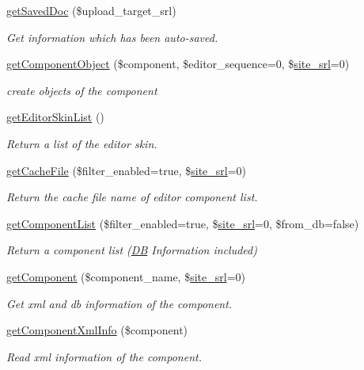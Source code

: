 \begin{DoxyCompactItemize}
\hyperlink{classeditorModel_af9c4c2f7ba2d377b087cac08412b0baa}{get\+Saved\+Doc} (\$upload\+\_\+target\+\_\+srl)
\begin{DoxyCompactList}\small\item\em Get information which has been auto-\/saved. \end{DoxyCompactList}\item 
\hyperlink{classeditorModel_aef219fecfb7dcd9343cc9028930eaccd}{get\+Component\+Object} (\$component, \$editor\+\_\+sequence=0, \$\hyperlink{ko_8install_8php_a8b1406b4ad1048041558dce6bfe89004}{site\+\_\+srl}=0)
\begin{DoxyCompactList}\small\item\em create objects of the component \end{DoxyCompactList}\item 
\hyperlink{classeditorModel_ae67ee69d58776938a04d14d0df5284ff}{get\+Editor\+Skin\+List} ()
\begin{DoxyCompactList}\small\item\em Return a list of the editor skin. \end{DoxyCompactList}\item 
\hyperlink{classeditorModel_ab125348dd5be10fdafe6e38922254d5e}{get\+Cache\+File} (\$filter\+\_\+enabled=true, \$\hyperlink{ko_8install_8php_a8b1406b4ad1048041558dce6bfe89004}{site\+\_\+srl}=0)
\begin{DoxyCompactList}\small\item\em Return the cache file name of editor component list. \end{DoxyCompactList}\item 
\hyperlink{classeditorModel_a24cf5d2f9bc9783dd2efd85fb0f89408}{get\+Component\+List} (\$filter\+\_\+enabled=true, \$\hyperlink{ko_8install_8php_a8b1406b4ad1048041558dce6bfe89004}{site\+\_\+srl}=0, \$from\+\_\+db=false)
\begin{DoxyCompactList}\small\item\em Return a component list (\hyperlink{classDB}{DB} Information included) \end{DoxyCompactList}\item 
\hyperlink{classeditorModel_a6330fcddc7363899989bfe4128010236}{get\+Component} (\$component\+\_\+name, \$\hyperlink{ko_8install_8php_a8b1406b4ad1048041558dce6bfe89004}{site\+\_\+srl}=0)
\begin{DoxyCompactList}\small\item\em Get xml and db information of the component. \end{DoxyCompactList}\item 
\hyperlink{classeditorModel_ade91abf13956321e293195f2f14b4e2b}{get\+Component\+Xml\+Info} (\$component)
\begin{DoxyCompactList}\small\item\em Read xml information of the component. \end{DoxyCompactList}\end{DoxyCompactItemize}
